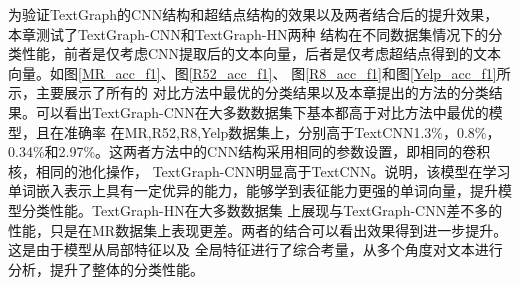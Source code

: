 为验证TextGraph的CNN结构和超结点结构的效果以及两者结合后的提升效果，本章测试了TextGraph-CNN和TextGraph-HN两种
结构在不同数据集情况下的分类性能，前者是仅考虑CNN提取后的文本向量，后者是仅考虑超结点得到的文本向量。如图\ref{MR_acc_f1}、图\ref{R52_acc_f1}、
图\ref{R8_acc_f1}和图\ref{Yelp_acc_f1}所示，主要展示了所有的
对比方法中最优的分类结果以及本章提出的方法的分类结果。可以看出TextGraph-CNN在大多数数据集下基本都高于对比方法中最优的模型，且在准确率
在MR,R52,R8,Yelp数据集上，分别高于TextCNN1.3\%，0.8\%，0.34\%和2.97\%。这两者方法中的CNN结构采用相同的参数设置，即相同的卷积核，相同的池化操作，
TextGraph-CNN明显高于TextCNN。说明，该模型在学习单词嵌入表示上具有一定优异的能力，能够学到表征能力更强的单词向量，提升模型分类性能。TextGraph-HN在大多数数据集
上展现与TextGraph-CNN差不多的性能，只是在MR数据集上表现更差。两者的结合可以看出效果得到进一步提升。这是由于模型从局部特征以及
全局特征进行了综合考量，从多个角度对文本进行分析，提升了整体的分类性能。

